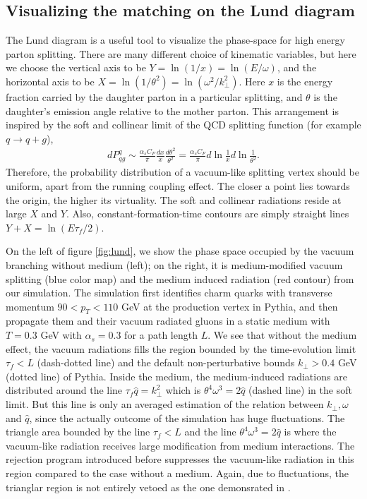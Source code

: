 \subsection{Visualizing the matching on the Lund diagram}
The Lund diagram is a useful tool to visualize the phase-space for high energy parton splitting.
There are many different choice of kinematic variables, but here we choose the vertical axis to be $Y = \ln(1/x) = \ln(E/\omega)$, and the horizontal 
axis to be $X = \ln(1/\theta^2) = \ln(\omega^2/k_\perp^2)$.
Here $x$ is the energy fraction carried by the daughter parton in a particular splitting, and $\theta$ is the daughter's emission angle relative to the mother parton.
This arrangement is inspired by the soft and collinear limit of the QCD splitting function (for example $q\rightarrow q+g$),
\begin{eqnarray}
dP^{q}_{qg} \sim \frac{\alpha_s C_F}{\pi} \frac{dx}{x}\frac{d\theta^2}{\theta^2} = \frac{\alpha_s C_F}{\pi} d\ln\frac{1}{x} d\ln\frac{1}{\theta^2}.
\end{eqnarray}
Therefore, the probability distribution of a vacuum-like splitting vertex should be uniform, apart from the running coupling effect.
The closer a point lies towards the origin, the higher its virtuality.
The soft and collinear radiations reside at large $X$ and $Y$.
Also, constant-formation-time contours are simply straight lines $Y+X=\ln(E\tau_f/2)$.

On the left of figure \ref{fig:lund}, we show the phase space occupied by the vacuum branching without medium (left); on the right, it is medium-modified vacuum splitting (blue color map) and the medium induced radiation (red contour) from our simulation.
The simulation first identifies charm quarks with transverse momentum $90 < p_T <110$ GeV at the production vertex in Pythia, and then propagate them and their vacuum radiated gluons in a static medium with $T=0.3$ GeV with $\alpha_s = 0.3$ for a path length $L$.
We see that without the medium effect, the vacuum radiations fills the region bounded by the time-evolution limit $\tau_f < L$ (dash-dotted line) and the default non-perturbative bounds $k_\perp > 0.4$ GeV (dotted line) of Pythia. 
Inside the medium, the medium-induced radiations are distributed around the line $\tau_f\hat{q} = k_\perp^2$ which is $\theta^4\omega^3 = 2\hat{q}$ (dashed line) in the soft limit.  
But this line is only an averaged estimation of the relation between $k_\perp, \omega$ and $\hat{q}$, since the actually outcome of the simulation has huge fluctuations.
The triangle area bounded by the line $\tau_f < L$ and the line $\theta^4\omega^3 = 2\hat{q}$ is where the vacuum-like radiation receives large modification from medium interactions.
The rejection program introduced before suppresses the vacuum-like radiation in this region compared to the case without a medium.
Again, due to fluctuations, the trianglar region is not entirely vetoed as the one demonsrated in \cite{PhysRevLett.120.232001}.

